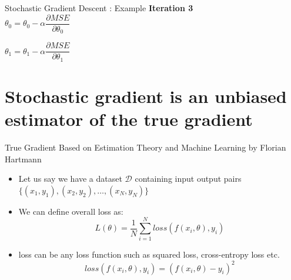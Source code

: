 \documentclass[usenames,dvipsnames]{beamer}
\begin{document}
                        \begin{frame}{Stochastic Gradient Descent : Example}
                        \textbf{Iteration 3}\\
                        \vspace{0.5cm}
                        $\theta_0 = \theta_0 - \alpha\dfrac{\partial MSE}{\partial \theta_0}$\\ 
                        \vspace{0.5cm}
                        
                        $\theta_1 = \theta_1 - \alpha\dfrac{\partial MSE}{\partial \theta_1}$\\ 
                        \vspace{0.5cm}
                        \end{frame}
                                       
                        
    \section{Stochastic gradient is an unbiased estimator of the true gradient}


    \begin{frame}{True Gradient}
        Based on Estimation Theory and Machine Learning by Florian Hartmann

        \begin{itemize}[<+->]
            \item Let us say we have a dataset $\mathcal{D}$ containing input output pairs $\{(x_1, y_1), (x_2, y_2), \ldots, (x_N, y_N)\}$
            \item We can define overall loss as:
                $$L(\theta) = \frac{1}{N}\sum_{i=1}^{N}loss(f(x_i, \theta), y_i)$$
            \item loss can be any loss function such as squared loss, cross-entropy loss etc.
            $$loss(f(x_i, \theta), y_i) = (f(x_i, \theta) - y_i)^2$$
        \end{itemize}
    \end{frame}
                
\end{document}
